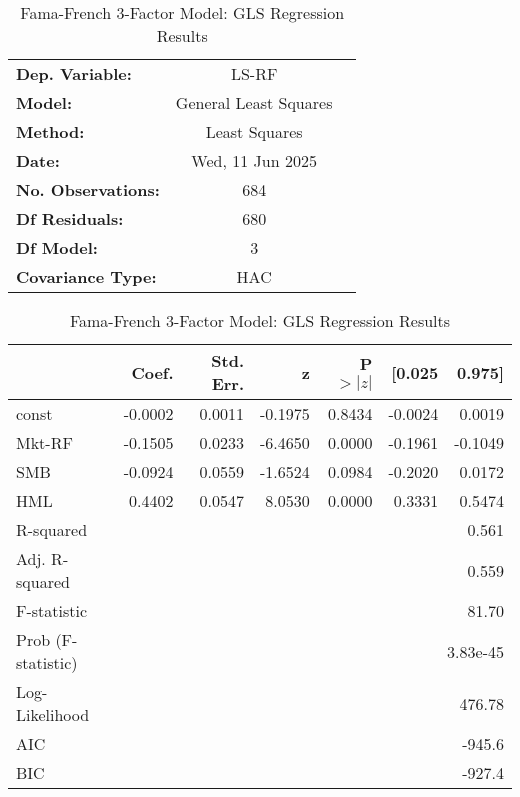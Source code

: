 \begin{table}[htbp]
\centering
\caption{GLS Regression Results}
\begin{tabular}{lcl}
\toprule
\textbf{Dep. Variable:} & LS-RF & \\
\textbf{Model:} & General Least Squares & \\
\textbf{Method:} & Least Squares & \\
\textbf{Date:} & Wed, 11 Jun 2025 & \\
\textbf{No. Observations:} & 684 & \\
\textbf{Df Residuals:} & 680 & \\
\textbf{Df Model:} & 3 & \\
\textbf{Covariance Type:} & HAC & \\
\bottomrule
\end{tabular}
\vspace{0.5em}
\centering
\caption{Fama-French 3-Factor Model: GLS Regression Results}
\label{tab:gls_results}
\begin{tabular}{lrrrrrr}
\toprule
 & Coef. & Std. Err. & z & P$>|z|$ & [0.025 & 0.975] \\
\midrule
const & -0.0002 & 0.0011 & -0.1975 & 0.8434 & -0.0024 & 0.0019 \\
Mkt-RF & -0.1505 & 0.0233 & -6.4650 & 0.0000 & -0.1961 & -0.1049 \\
SMB & -0.0924 & 0.0559 & -1.6524 & 0.0984 & -0.2020 & 0.0172 \\
HML & 0.4402 & 0.0547 & 8.0530 & 0.0000 & 0.3331 & 0.5474 \\
\midrule
R-squared & \multicolumn{6}{r}{0.561} \\
Adj. R-squared & \multicolumn{6}{r}{0.559} \\
F-statistic & \multicolumn{6}{r}{81.70} \\
Prob (F-statistic) & \multicolumn{6}{r}{3.83e-45} \\
Log-Likelihood & \multicolumn{6}{r}{476.78} \\
AIC & \multicolumn{6}{r}{-945.6} \\
BIC & \multicolumn{6}{r}{-927.4} \\
\bottomrule
\end{tabular}
\end{table}